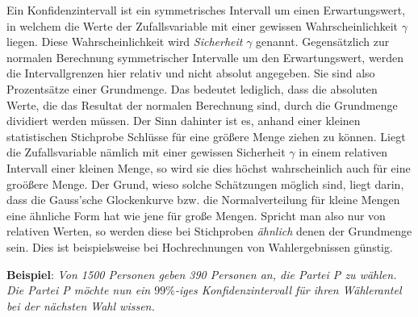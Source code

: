 Ein Konfidenzintervall ist ein symmetrisches Intervall um einen Erwartungswert, in welchem die Werte der Zufallsvariable mit einer gewissen Wahrscheinlichkeit $\gamma$ liegen. Diese Wahrscheinlichkeit wird \emph{Sicherheit} $\gamma$ genannt. Gegens\"{a}tzlich zur normalen Berechnung symmetrischer Intervalle um den Erwartungswert, werden die Intervallgrenzen hier relativ und nicht absolut angegeben. Sie sind also Prozents\"{a}tze einer Grundmenge. Das bedeutet lediglich, dass die absoluten Werte, die das Resultat der normalen Berechnung sind, durch die Grundmenge dividiert werden m\"{u}ssen. Der Sinn dahinter ist es, anhand einer kleinen statistischen Stichprobe Schl\"{u}sse f\"{u}r eine gr\"{o}\ss{}ere Menge ziehen zu k\"{o}nnen. Liegt die Zufallsvariable n\"{a}mlich mit einer gewissen Sicherheit $\gamma$ in einem relativen Intervall einer kleinen Menge, so wird sie dies h\"{o}chst wahrscheinlich auch f\"{u}r eine gro\"{o}\ss{}ere Menge. Der Grund, wieso solche Sch\"{a}tzungen m\"{o}glich sind, liegt darin, dass die Gauss'sche Glockenkurve bzw. die Normalverteilung f\"{u}r kleine Mengen eine \"{a}hnliche Form hat wie jene f\"{u}r gro\ss{}e Mengen. Spricht man also nur von relativen Werten, so werden diese bei Stichproben \emph{\"{a}hnlich} denen der Grundmenge sein. Dies ist beispielsweise bei Hochrechnungen von Wahlergebnissen g\"{u}nstig.

\textbf{Beispiel}: \emph{Von 1500 Personen geben 390 Personen an, die Partei P zu w\"{a}hlen. Die Partei P m\"{o}chte nun ein $99\%$-iges Konfidenzintervall f\"{u}r ihren W\"{a}hlerantel bei der n\"{a}chsten Wahl wissen.}

